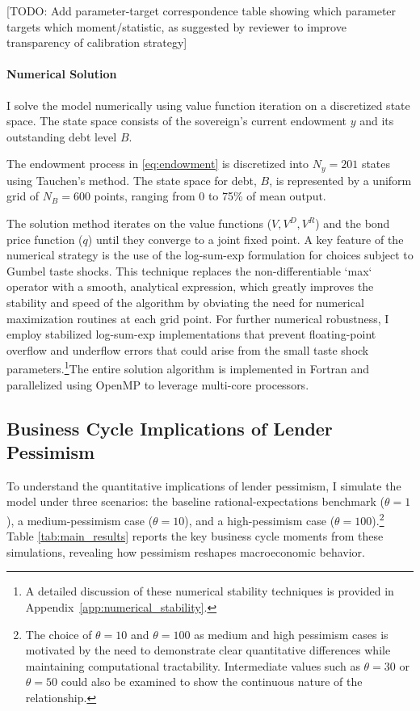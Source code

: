 \documentclass[12pt]{article}
\theoremstyle{plain}
\begin{document}
\begin{table}[h!]
	{\color{red}[TODO: Add parameter-target correspondence table showing which parameter targets which moment/statistic, as suggested by reviewer to improve transparency of calibration strategy]}
\end{table}

\paragraph{Numerical Solution}
I solve the model numerically using value function iteration on a discretized
state space. The state space consists of the sovereign's current endowment $y$
and its outstanding debt level $B$.

The endowment process in \eqref{eq:endowment} is discretized into $N_y = 201$
states using Tauchen's method. The state space for debt, $B$, is represented by
a uniform grid of $N_B = 600$ points, ranging from 0 to 75\% of mean output.

The solution method iterates on the value functions ($V, V^D, V^R$) and the
bond price function ($q$) until they converge to a joint fixed point. A key
feature of the numerical strategy is the use of the log-sum-exp formulation for
choices subject to Gumbel taste shocks. This technique replaces the
non-differentiable `max` operator with a smooth, analytical expression, which
greatly improves the stability and speed of the algorithm by obviating the need
for numerical maximization routines at each grid point. For further numerical
robustness, I employ stabilized log-sum-exp implementations that prevent
floating-point overflow and underflow errors that could arise from the small
taste shock parameters.\footnote{ A detailed discussion of these numerical
	stability techniques is provided in Appendix~\ref{app:numerical_stability}.
}The entire solution algorithm is implemented in Fortran and parallelized using
OpenMP to leverage multi-core processors.

\subsection{Business Cycle Implications of Lender Pessimism}

To understand the quantitative implications of lender pessimism, I simulate the
model under three scenarios: the baseline rational-expectations benchmark
($\theta=1$), a medium-pessimism case ($\theta=10$), and a high-pessimism case
($\theta=100$).\footnote{The choice of $\theta=10$ and $\theta=100$ as medium
	and high pessimism cases is motivated by the need to demonstrate clear
	quantitative differences while maintaining computational tractability.
	Intermediate values such as $\theta=30$ or $\theta=50$ could also be examined
	to show the continuous nature of the relationship.} Table
\ref{tab:main_results} reports the key business cycle moments from these
simulations, revealing how pessimism reshapes macroeconomic behavior.
\end{document}
